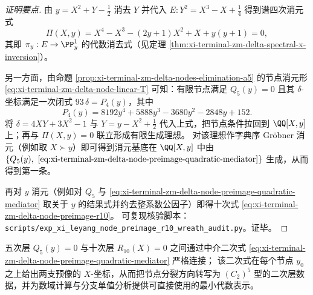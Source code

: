 \begin{proof}[证明要点]
由 \(y=X^{2}+Y-\tfrac12\) 消去 \(Y\) 并代入 \(E:Y^{2}=X^{3}-X+\tfrac14\) 得到谱四次消元式
\[
\Pi(X,y)=X^{4}-X^{3}-(2y+1)X^{2}+X+y(y+1)=0,
\]
其即 \(\pi_y:E\to\PP^1_y\) 的代数消去式（见定理 \ref{thm:xi-terminal-zm-delta-spectral-x-inversion}）。
\par
另一方面，由命题 \ref{prop:xi-terminal-zm-delta-nodes-elimination-a5} 的节点消元形 \eqref{eq:xi-terminal-zm-delta-node-linear-T} 可知：有限节点满足 \(Q_5(y)=0\) 且其 \(\delta\)-坐标满足一次闭式 \(93\,\delta=P_4(y)\)，其中
\[
P_4(y)=8192y^{4}+5888y^{3}-3680y^{2}-2848y+152.
\]
将 \(\delta=4XY+3X^{2}-1\) 与 \(Y=y-X^{2}+\tfrac12\) 代入上式，把节点条件拉回到 \(\QQ[X,y]\) 上；再与 \(\Pi(X,y)=0\) 联立形成有限生成理想。
对该理想作字典序 Gröbner 消元（例如取 \(X\succ y\)）即可得到消元基底在 \(\QQ[X,y]\) 中由 \(\{Q_5(y),\ \eqref{eq:xi-terminal-zm-delta-node-preimage-quadratic-mediator}\}\) 生成，从而得到第一条。
\par
再对 \(y\) 消元（例如对 \(Q_5\) 与 \eqref{eq:xi-terminal-zm-delta-node-preimage-quadratic-mediator} 取关于 \(y\) 的结果式并约去整系数公因子）即得十次式 \eqref{eq:xi-terminal-zm-delta-node-preimage-r10}。
可复现核验脚本：\texttt{scripts/exp\_xi\_leyang\_node\_preimage\_r10\_wreath\_audit.py}。证毕。
\end{proof}

\begin{remark}[节点层的最小代数连结]\label{rem:xi-terminal-zm-delta-node-preimage-minimal-algebraic-bridge}
五次层 \(Q_5(y)=0\) 与十次层 \(R_{10}(X)=0\) 之间通过中介二次式 \eqref{eq:xi-terminal-zm-delta-node-preimage-quadratic-mediator} 严格连接；
该二次式在每个节点 \(y_0\) 之上给出两支预像的 \(X\)-坐标，从而把节点分裂方向转写为 \((C_2)^5\) 型的二次层数据，并为数域计算与分支单值分析提供可直接使用的最小代数表示。
\end{remark}


